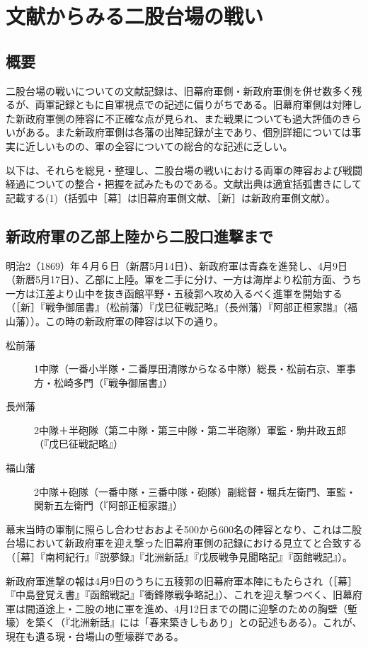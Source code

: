 \documentclass[11pt,report]{jsarticle}
\begin{document}
\section{文献からみる二股台場の戦い}
\subsection{概要}
二股台場の戦いについての文献記録は、旧幕府軍側・新政府軍側を併せ数多く残るが、両軍記録ともに自軍視点での記述に偏りがちである。旧幕府軍側は対陣した新政府軍側の陣容に不正確な点が見られ、また戦果についても過大評価のきらいがある。また新政府軍側は各藩の出陣記録が主であり、個別詳細については事実に近しいものの、軍の全容についての総合的な記述に乏しい。

以下は、それらを総見・整理し、二股台場の戦いにおける両軍の陣容および戦闘経過についての整合・把握を試みたものである。文献出典は適宜括弧書きにして記載する(1)（括弧中［幕］は旧幕府軍側文献、［新］は新政府軍側文献）。

\subsection{新政府軍の乙部上陸から二股口進撃まで}
明治2（1869）年４月６日（新暦5月14日）、新政府軍は青森を進発し、4月9日（新暦5月17日）、乙部に上陸。軍を二手に分け、一方は海岸より松前方面、うち一方は江差より山中を抜き函館平野・五稜郭へ攻め入るべく進軍を開始する（［新］『戦争御届書』（松前藩）『戊巳征戦記略』（長州藩）『阿部正桓家譜』（福山藩））。この時の新政府軍の陣容は以下の通り。

\begin{description}
\item [松前藩] 1中隊（一番小半隊・二番厚田清隊からなる中隊）総長・松前右京、軍事方・松崎多門（『戦争御届書』）
\item [長州藩] 2中隊＋半砲隊（第二中隊・第三中隊・第二半砲隊）軍監・駒井政五郎（『戊巳征戦記略』）
\item [福山藩] 2中隊＋砲隊（一番中隊・三番中隊・砲隊）副総督・堀兵左衛門、軍監・関新五左衛門（『阿部正桓家譜』）
\end{description}

幕末当時の軍制に照らし合わせおおよそ500から600名の陣容となり、これは二股台場において新政府軍を迎え撃った旧幕府軍側の記録における見立てと合致する（［幕］『南柯紀行』『説夢録』『北洲新話』『戊辰戦争見聞略記』『函館戦記』）。

新政府軍進撃の報は4月9日のうちに五稜郭の旧幕府軍本陣にもたらされ（［幕］『中島登覚え書』『函館戦記』『衝鋒隊戦争略記』）、これを迎え撃つべく、旧幕府軍は間道途上・二股の地に軍を進め、4月12日までの間に迎撃のための胸壁（塹壕）を築く（『北洲新話』には「春来築きしもあり」との記述もある）。これが、現在も遺る現・台場山の塹壕群である。
\end{document}
